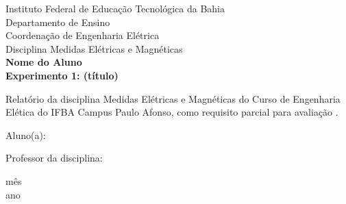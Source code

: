 \documentclass[a4paper, 12pt]{article}
\begin{document}
\begin{titlepage}
	\begin{center}
	

		\Large{Instituto Federal de Educação Tecnológica da Bahia}\\
		\large{Departamento de Ensino}\\ 
		\large{Coordenação de Engenharia Elétrica}\\ 
        \large{Disciplina Medidas Elétricas e Magnéticas}\\ 
        \vspace{115pt}
        \textbf{\Large{Nome do Aluno }}\\
		\vspace{15pt}
        \vspace{95pt}
        \textbf{\Large{Experimento 1: (título) }}\\
		\vspace{3,5cm}
	\end{center}
	
	\begin{flushright}

   \begin{list}{}{
      \setlength{\leftmargin}{10cm}
      \setlength{\rightmargin}{0cm}
      \setlength{\labelwidth}{0pt}
      \setlength{\labelsep}{\leftmargin}}

      \item Relatório da disciplina Medidas Elétricas e Magnéticas do Curso de Engenharia Elética do IFBA Campus Paulo Afonso, como requisito parcial para avaliação .

      \begin{list}{}{
      \setlength{\leftmargin}{0cm}
      \setlength{\rightmargin}{0cm}
      \setlength{\labelwidth}{0pt}
      \setlength{\labelsep}{\leftmargin}}

			
            \item Aluno(a): \
      		\item Professor da disciplina: \

      \end{list}
   \end{list}
\end{flushright}
\vspace{1cm}
\begin{center}
		\vspace{\fill}
		 mês\\
		 ano
			\end{center}
\end{titlepage}
\end{document}
